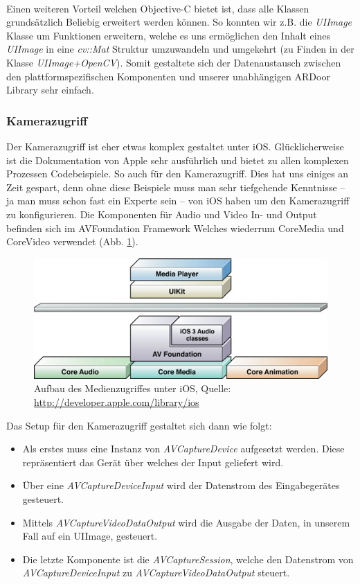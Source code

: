 \documentclass[main.tex]{subfiles}
\begin{document}
\paragraph{}
Einen weiteren Vorteil welchen Objective-C bietet ist, dass alle Klassen grundsätzlich Beliebig erweitert werden können. So konnten wir z.B. die \textit{UIImage} Klasse um Funktionen erweitern, welche es uns ermöglichen den Inhalt eines \textit{UIImage} in eine \textit{cv::Mat} Struktur umzuwandeln und umgekehrt (zu Finden in der Klasse \textit{UIImage+OpenCV}). Somit gestaltete sich der Datenaustausch zwischen den plattformspezifischen Komponenten und unserer unabhängigen ARDoor Library sehr einfach.

\subsubsection{Kamerazugriff} Der Kamerazugriff ist eher etwas komplex gestaltet unter iOS. Glücklicherweise ist die Dokumentation von Apple sehr ausführlich und bietet zu allen komplexen Prozessen Codebeispiele. So auch für den Kamerazugriff. Dies hat uns einiges an Zeit gespart, denn ohne diese Beispiele muss man sehr tiefgehende Kenntnisse – ja man muss schon fast ein Experte sein – von iOS haben um den Kamerazugriff zu konfigurieren. Die Komponenten für Audio und Video In- und Output befinden sich im AVFoundation Framework Welches wiederrum CoreMedia und CoreVideo verwendet (Abb. \ref{fig:avfoundation}).

\begin{figure}[!ht]
\centering
\includegraphics[scale=0.6]{images/avfoundation.jpg} 
\caption{Aufbau des Medienzugriffes unter iOS, Quelle: \url{http://developer.apple.com/library/ios}}
\label{fig:avfoundation}
\end{figure}

Das Setup für den Kamerazugriff gestaltet sich dann wie folgt:

\begin{itemize}
\item Als erstes muss eine Instanz von \textit{AVCaptureDevice} aufgesetzt werden. Diese repräsentiert das Gerät über welches der Input geliefert wird.
\item Über eine \textit{AVCaptureDeviceInput} wird der Datenstrom des Eingabegerätes gesteuert.
\item Mittels \textit{AVCaptureVideoDataOutput} wird die Ausgabe der Daten, in unserem Fall auf ein UIImage, gesteuert.
\item Die letzte Komponente ist die \textit{AVCaptureSession}, welche den Datenstrom von \textit{AVCaptureDeviceInput} zu \textit{AVCaptureVideoDataOutput} steuert.
\end{itemize}
\end{document}
